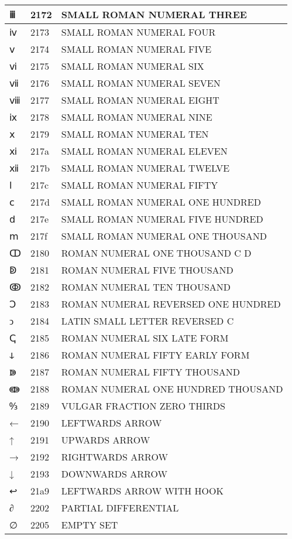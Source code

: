 \documentclass[12pt,letterpaper,openany]{book}
\begin{document}
\begin{center}
\begin{supertabular}{|m{0.25in}|m{0.5in}|m{4in}|}
ⅲ & 2172 & SMALL ROMAN NUMERAL THREE\\\hline
ⅳ & 2173 & SMALL ROMAN NUMERAL FOUR\\\hline
ⅴ & 2174 & SMALL ROMAN NUMERAL FIVE\\\hline
ⅵ & 2175 & SMALL ROMAN NUMERAL SIX\\\hline
ⅶ & 2176 & SMALL ROMAN NUMERAL SEVEN\\\hline
ⅷ & 2177 & SMALL ROMAN NUMERAL EIGHT\\\hline
ⅸ & 2178 & SMALL ROMAN NUMERAL NINE\\\hline
ⅹ & 2179 & SMALL ROMAN NUMERAL TEN\\\hline
ⅺ & 217a & SMALL ROMAN NUMERAL ELEVEN\\\hline
ⅻ & 217b & SMALL ROMAN NUMERAL TWELVE\\\hline
ⅼ & 217c & SMALL ROMAN NUMERAL FIFTY\\\hline
ⅽ & 217d & SMALL ROMAN NUMERAL ONE HUNDRED\\\hline
ⅾ & 217e & SMALL ROMAN NUMERAL FIVE HUNDRED\\\hline
ⅿ & 217f & SMALL ROMAN NUMERAL ONE THOUSAND\\\hline
ↀ & 2180 & ROMAN NUMERAL ONE THOUSAND C D\\\hline
ↁ & 2181 & ROMAN NUMERAL FIVE THOUSAND\\\hline
ↂ & 2182 & ROMAN NUMERAL TEN THOUSAND\\\hline
Ↄ & 2183 & ROMAN NUMERAL REVERSED ONE HUNDRED\\\hline
ↄ & 2184 & LATIN SMALL LETTER REVERSED C\\\hline
ↅ & 2185 & ROMAN NUMERAL SIX LATE FORM\\\hline
ↆ & 2186 & ROMAN NUMERAL FIFTY EARLY FORM\\\hline
ↇ & 2187 & ROMAN NUMERAL FIFTY THOUSAND\\\hline
ↈ & 2188 & ROMAN NUMERAL ONE HUNDRED THOUSAND\\\hline
↉ & 2189 & VULGAR FRACTION ZERO THIRDS\\\hline
← & 2190 & LEFTWARDS ARROW\\\hline
↑ & 2191 & UPWARDS ARROW\\\hline
→ & 2192 & RIGHTWARDS ARROW\\\hline
↓ & 2193 & DOWNWARDS ARROW\\\hline
↩ & 21a9 & LEFTWARDS ARROW WITH HOOK\\\hline
∂ & 2202 & PARTIAL DIFFERENTIAL\\\hline
∅ & 2205 & EMPTY SET\\\hline

\end{supertabular}
\end{center}
\end{document}
